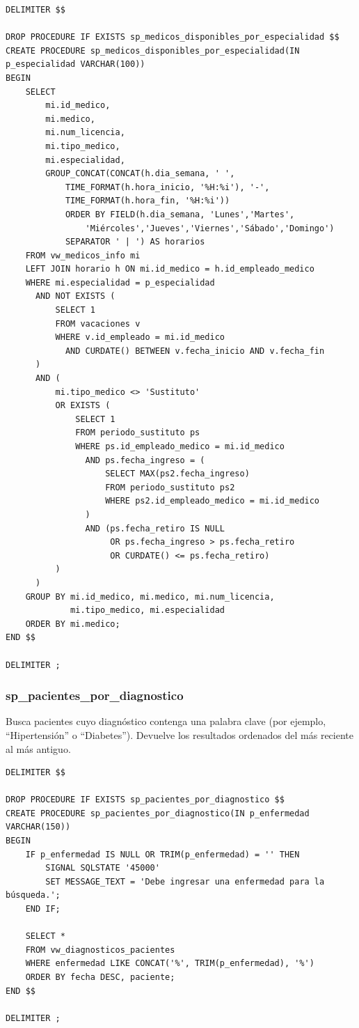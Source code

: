 \documentclass[12pt,a4paper]{article}
\begin{document}
{\small\begin{verbatim}
DELIMITER $$

DROP PROCEDURE IF EXISTS sp_medicos_disponibles_por_especialidad $$
CREATE PROCEDURE sp_medicos_disponibles_por_especialidad(IN p_especialidad VARCHAR(100))
BEGIN
    SELECT
        mi.id_medico,
        mi.medico,
        mi.num_licencia,
        mi.tipo_medico,
        mi.especialidad,
        GROUP_CONCAT(CONCAT(h.dia_semana, ' ',
            TIME_FORMAT(h.hora_inicio, '%H:%i'), '-',
            TIME_FORMAT(h.hora_fin, '%H:%i'))
            ORDER BY FIELD(h.dia_semana, 'Lunes','Martes',
                'Miércoles','Jueves','Viernes','Sábado','Domingo')
            SEPARATOR ' | ') AS horarios
    FROM vw_medicos_info mi
    LEFT JOIN horario h ON mi.id_medico = h.id_empleado_medico
    WHERE mi.especialidad = p_especialidad
      AND NOT EXISTS (
          SELECT 1
          FROM vacaciones v
          WHERE v.id_empleado = mi.id_medico
            AND CURDATE() BETWEEN v.fecha_inicio AND v.fecha_fin
      )
      AND (
          mi.tipo_medico <> 'Sustituto'
          OR EXISTS (
              SELECT 1
              FROM periodo_sustituto ps
              WHERE ps.id_empleado_medico = mi.id_medico
                AND ps.fecha_ingreso = (
                    SELECT MAX(ps2.fecha_ingreso)
                    FROM periodo_sustituto ps2
                    WHERE ps2.id_empleado_medico = mi.id_medico
                )
                AND (ps.fecha_retiro IS NULL
                     OR ps.fecha_ingreso > ps.fecha_retiro
                     OR CURDATE() <= ps.fecha_retiro)
          )
      )
    GROUP BY mi.id_medico, mi.medico, mi.num_licencia,
             mi.tipo_medico, mi.especialidad
    ORDER BY mi.medico;
END $$

DELIMITER ;
\end{verbatim}}

\subsubsection{sp\_pacientes\_por\_diagnostico}
Busca pacientes cuyo diagn\'ostico contenga una palabra clave (por ejemplo, ``Hipertensi\'on'' o ``Diabetes''). Devuelve los resultados ordenados del m\'as reciente al m\'as antiguo.

{\small\begin{verbatim}
DELIMITER $$

DROP PROCEDURE IF EXISTS sp_pacientes_por_diagnostico $$
CREATE PROCEDURE sp_pacientes_por_diagnostico(IN p_enfermedad VARCHAR(150))
BEGIN
    IF p_enfermedad IS NULL OR TRIM(p_enfermedad) = '' THEN
        SIGNAL SQLSTATE '45000'
        SET MESSAGE_TEXT = 'Debe ingresar una enfermedad para la búsqueda.';
    END IF;

    SELECT *
    FROM vw_diagnosticos_pacientes
    WHERE enfermedad LIKE CONCAT('%', TRIM(p_enfermedad), '%')
    ORDER BY fecha DESC, paciente;
END $$

DELIMITER ;
\end{verbatim}}
\end{document}
